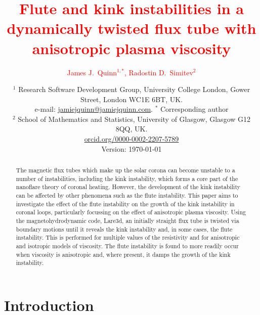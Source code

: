 \documentclass[12pt]{article}
\newcommand{\rs}[2]{\textcolor{red}{#2}}
\begin{document}

\title{\rs{Kink and fluting instabilities in a dynamically twisted
    flux tube}{Flute and kink instabilities in a dynamically twisted
    flux tube with anisotropic plasma viscosity}}
\author{\rs{}{James J.~Quinn$^{1,\ast}$, Radostin D.~Simitev$^2$}}
\date{\small
  $^1$ Research Software Development Group, University College London, Gower Street, London WC1E 6BT, UK.\\
  e-mail:
  \href{mailto:jamiejquinn@jamiejquinn.com}{jamiejquinn@jamiejquinn.com}. $^\ast$
  Corresponding author\\
  $^2$ School of Mathematics and Statistics, University of Glasgow,
  Glasgow G12 8QQ,
  UK. \\ \href{https://orcid.org/0000-0002-2207-5789}{orcid.org/0000-0002-2207-5789}\\
\vspace{5mm}
  Version: \today}
\maketitle

\graphicspath{{images/kink_instability_straight/}}


\begin{abstract}
  The magnetic flux tubes which make up the solar corona can become unstable to a number of instabilities, including the kink instability, which forms a core part of the nanoflare theory of coronal heating. However, the development of the kink instability can be affected by other phenomena such as the flute instability.
  This paper aims to investigate the effect of the flute instability on the growth of the kink instability in coronal loops, particularly focussing on the effect of anisotropic plasma viscosity.
  Using the magnetohydrodynamic code, Lare3d, an initially straight flux tube is twisted via boundary motions until it reveals the kink instability and, in some cases, the flute instability. This is performed for multiple values of the resistivity and for anisotropic and isotropic models of viscosity.
  The flute instability is found to more readily occur when viscosity is anisotropic and, where present, it damps the growth of the kink instability.
\end{abstract}

\section{Introduction}
\end{document}

